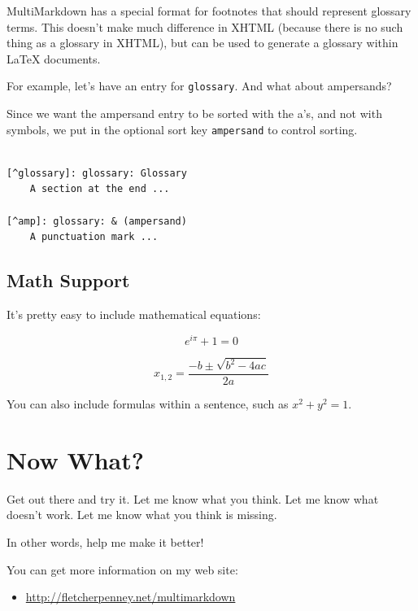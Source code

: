 MultiMarkdown has a special format for footnotes that should represent
glossary terms. This doesn't make much difference in XHTML (because there is
no such thing as a glossary in XHTML), but can be used to generate a glossary
within LaTeX documents.

For example, let's have an entry for \texttt{glossary}. And what about
ampersands?\glsadd{& }

Since we want the ampersand entry to be sorted with the a's, and not with
symbols, we put in the optional sort key \texttt{ampersand} to control sorting.

\begin{adjustwidth}{2.5em}{2.5em}
\begin{verbatim}

[^glossary]: glossary: Glossary 
    A section at the end ...

[^amp]: glossary: & (ampersand)
    A punctuation mark ...

\end{verbatim}
\end{adjustwidth}

\section{Math Support}
\label{mathsupport}

It's pretty easy to include mathematical equations:

\[ {e}^{i\pi }+1=0 \]

\[ {x}_{1,2}=\frac{-b\pm \sqrt{{b}^{2}-4ac}}{2a} \]

You can also include formulas within a sentence, such as
\({x}^{2}+{y}^{2}=1\).

\chapter{Now What?}
\label{nowwhat}

Get out there and try it. Let me know what you think. Let me know what doesn't
work. Let me know what you think is missing.

In other words, help me make it better!

You can get more information on my web site:

\begin{itemize}
\item \href{http://fletcherpenney.net/multimarkdown}{http:\slash \slash fletcherpenney.net\slash multimarkdown}

\end{itemize}

